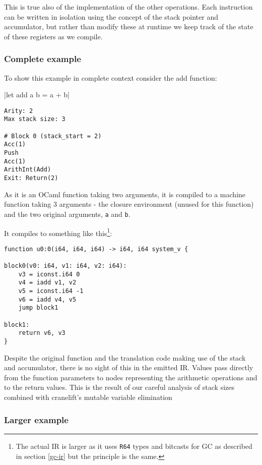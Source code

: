 This is true also of the implementation of the other operations. Each instruction can be written in
isolation using the concept of the stack pointer and accumulator, but rather than modify these at
runtime we keep track of the state of these registers as we compile.

\subsubsection{Complete example}

To show this example in complete context consider the add function:

|let add a b = a + b|

\begin{verbatim}
Arity: 2
Max stack size: 3

# Block 0 (stack_start = 2)
Acc(1)
Push
Acc(1)
ArithInt(Add)
Exit: Return(2)
\end{verbatim}

As it is an OCaml function taking two arguments, it is compiled to a machine function taking 3
arguments - the closure environment (unused for this function) and the two original arguments,
\texttt{a} and \texttt{b}.

It compiles to something like this\footnote{The actual IR is larger as it uses \texttt{R64} types
      and bitcasts for GC as
      described in section \ref{gc-ir} but the principle is the same.}:

\begin{verbatim}
function u0:0(i64, i64, i64) -> i64, i64 system_v {

block0(v0: i64, v1: i64, v2: i64):
    v3 = iconst.i64 0
    v4 = iadd v1, v2
    v5 = iconst.i64 -1
    v6 = iadd v4, v5
    jump block1

block1:
    return v6, v3
}
\end{verbatim}

Despite the original function and the translation code making use of the stack and accumulator,
there is no sight of this in the emitted IR. Values pass directly from the function parameters to
nodes representing the arithmetic operations and to the return values. This is the result of our
careful analysis of stack sizes combined with cranelift's mutable variable elimination

\subsubsection{Larger example}

